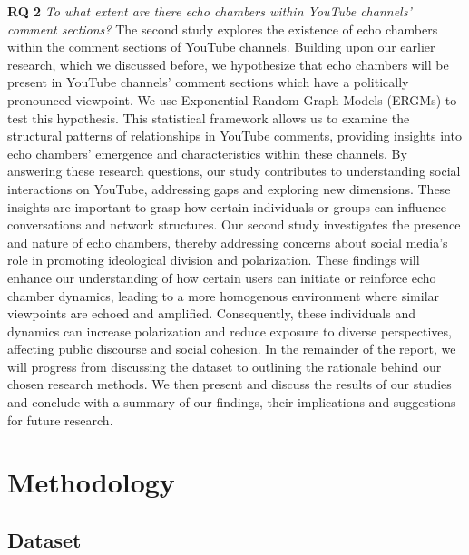 \documentclass[
  man,floatsintext]{apa6}
\begin{document}
\textbf{RQ 2} \emph{To what extent are there echo chambers within YouTube channels’ comment sections?}
The second study explores the existence of echo chambers within the comment sections of YouTube channels. Building upon our earlier research, which we discussed before, we hypothesize that echo chambers will be present in YouTube channels' comment sections which have a politically pronounced viewpoint. We use Exponential Random Graph Models (ERGMs) to test this hypothesis. This statistical framework allows us to examine the structural patterns of relationships in YouTube comments, providing insights into echo chambers' emergence and characteristics within these channels.
By answering these research questions, our study contributes to understanding social interactions on YouTube, addressing gaps and exploring new dimensions. These insights are important to grasp how certain individuals or groups can influence conversations and network structures. Our second study investigates the presence and nature of echo chambers, thereby addressing concerns about social media's role in promoting ideological division and polarization. These findings will enhance our understanding of how certain users can initiate or reinforce echo chamber dynamics, leading to a more homogenous environment where similar viewpoints are echoed and amplified. Consequently, these individuals and dynamics can increase polarization and reduce exposure to diverse perspectives, affecting public discourse and social cohesion.
In the remainder of the report, we will progress from discussing the dataset to outlining the rationale behind our chosen research methods. We then present and discuss the results of our studies and conclude with a summary of our findings, their implications and suggestions for future research. ~

\newpage

\section{Methodology}\label{methodology}

\subsection{Dataset}\label{dataset}
\end{document}
